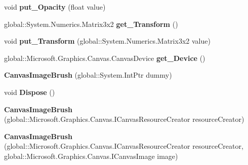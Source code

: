 \begin{DoxyCompactItemize}
void {\bfseries put\+\_\+\+Opacity} (float value)
\item 
\mbox{\label{class_microsoft_1_1_graphics_1_1_canvas_1_1_brushes_1_1_canvas_image_brush_aecf3140564df93caed075a2657fac1ee}} 
global\+::\+System.\+Numerics.\+Matrix3x2 {\bfseries get\+\_\+\+Transform} ()
\item 
\mbox{\label{class_microsoft_1_1_graphics_1_1_canvas_1_1_brushes_1_1_canvas_image_brush_aacd3a10615ba452348d129139e6f0c68}} 
void {\bfseries put\+\_\+\+Transform} (global\+::\+System.\+Numerics.\+Matrix3x2 value)
\item 
\mbox{\label{class_microsoft_1_1_graphics_1_1_canvas_1_1_brushes_1_1_canvas_image_brush_abbc8ded9bdef5ad7ab6029fa7bc1eef6}} 
global\+::\+Microsoft.\+Graphics.\+Canvas.\+Canvas\+Device {\bfseries get\+\_\+\+Device} ()
\item 
\mbox{\label{class_microsoft_1_1_graphics_1_1_canvas_1_1_brushes_1_1_canvas_image_brush_acbfe907c1015a95d93b5213836119f03}} 
{\bfseries Canvas\+Image\+Brush} (global\+::\+System.\+Int\+Ptr dummy)
\item 
\mbox{\label{class_microsoft_1_1_graphics_1_1_canvas_1_1_brushes_1_1_canvas_image_brush_a287a8959ebff5767a97c27bfd52ec3b7}} 
void {\bfseries Dispose} ()
\item 
\mbox{\label{class_microsoft_1_1_graphics_1_1_canvas_1_1_brushes_1_1_canvas_image_brush_adbb56b8d19fbd4dfd899d515aba49f92}} 
{\bfseries Canvas\+Image\+Brush} (global\+::\+Microsoft.\+Graphics.\+Canvas.\+I\+Canvas\+Resource\+Creator resource\+Creator)
\item 
\mbox{\label{class_microsoft_1_1_graphics_1_1_canvas_1_1_brushes_1_1_canvas_image_brush_aeb29fd1437d8ae16d2fe8546010eb7db}} 
{\bfseries Canvas\+Image\+Brush} (global\+::\+Microsoft.\+Graphics.\+Canvas.\+I\+Canvas\+Resource\+Creator resource\+Creator, global\+::\+Microsoft.\+Graphics.\+Canvas.\+I\+Canvas\+Image image)

\end{DoxyCompactItemize}
